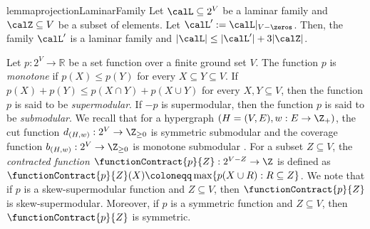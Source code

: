 \begin{restatable}{lemma}{projectionLaminarFamily}\label{lem:CoveringAlgorithm:projection-laminar-family}
    Let $\calL \subseteq 2^V$ be a laminar family and $\calZ \subseteq V$ be a subset of elements. 
    Let $\calL':=\calL|_{V-\zeros}$. 
    Then, the family $\calL'$ is a laminar family and $|\calL| \leq |\calL'| + 3|\calZ|$.
\end{restatable}



Let $p: 2^{V} \rightarrow \mathbb{R}$ be a set function over a finite ground set $V$. 
The function $p$ is \emph{monotone} if  $p(X)\le p(Y)$ for every $X\subseteq Y\subseteq V$. 
If $p(X)+p(Y)\le p(X\cap Y)+p(X\cup Y)$
for every $X,Y\subseteq V$, then the function $p$ is said to be \emph{supermodular}. 
If $-p$ is supermodular, then the function $p$ is said to be \emph{submodular}. 
We recall that for a hypergraph $(H=(V, E), w: E\rightarrow \Z_+)$, the cut function $d_{(H, w)}: 2^V\rightarrow \Z_{\ge 0}$ is symmetric submodular and the coverage function $b_{(H, w)}: 2^V\rightarrow \Z_{\ge 0}$ is monotone submodular \cite{Frank-book}. 
For a subset $Z \subseteq V$, the \emph{contracted function} $\functionContract{p}{Z} : 2^{V - Z}\rightarrow\Z$ is defined as $\functionContract{p}{Z}(X) \coloneqq  \max\{p(X\cup R) : R \subseteq Z\}$. We note that if $p$ is a skew-supermodular function and $Z\subseteq V$, then $\functionContract{p}{Z}$ is skew-supermodular. Moreover, if $p$ is a symmetric function and $Z\subseteq V$, then $\functionContract{p}{Z}$ is symmetric. 

